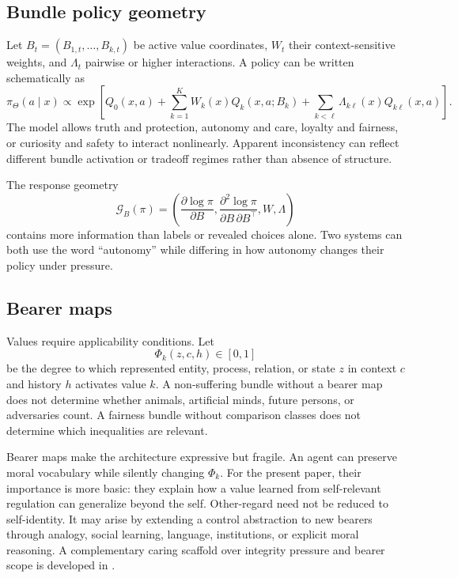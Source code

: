 \documentclass[11pt]{article}
\begin{document}
\subsection{Bundle policy geometry}

Let $B_t=(B_{1,t},\ldots,B_{k,t})$ be active value coordinates, $W_t$ their context-sensitive weights, and $\Lambda_t$ pairwise or higher interactions. A policy can be written schematically as
\begin{equation}
\pi_{\Theta}(a\mid x)
\propto
\exp\!\left[
Q_0(x,a)
+
\sum_{k=1}^K W_k(x)Q_k(x,a;B_k)
+
\sum_{k<\ell}\Lambda_{k\ell}(x)Q_{k\ell}(x,a)
\right].
\label{eq:bundle-policy}
\end{equation}
The model allows truth and protection, autonomy and care, loyalty and fairness, or curiosity and safety to interact nonlinearly. Apparent inconsistency can reflect different bundle activation or tradeoff regimes rather than absence of structure.

The response geometry
\begin{equation}
\mathcal G_B(\pi)
=
\left(
\frac{\partial\log\pi}{\partial B},
\frac{\partial^2\log\pi}{\partial B\,\partial B^\top},
W,\Lambda
\right)
\label{eq:response-geometry}
\end{equation}
contains more information than labels or revealed choices alone. Two systems can both use the word ``autonomy'' while differing in how autonomy changes their policy under pressure.

\subsection{Bearer maps}

Values require applicability conditions. Let
\begin{equation}
\Phi_k(z,c,h)\in[0,1]
\label{eq:bearer-map}
\end{equation}
be the degree to which represented entity, process, relation, or state $z$ in context $c$ and history $h$ activates value $k$. A non-suffering bundle without a bearer map does not determine whether animals, artificial minds, future persons, or adversaries count. A fairness bundle without comparison classes does not determine which inequalities are relevant.

Bearer maps make the architecture expressive but fragile. An agent can preserve moral vocabulary while silently changing $\Phi_k$. For the present paper, their importance is more basic: they explain how a value learned from self-relevant regulation can generalize beyond the self. Other-regard need not be reduced to self-identity. It may arise by extending a control abstraction to new bearers through analogy, social learning, language, institutions, or explicit moral reasoning. A complementary caring scaffold over integrity pressure and bearer scope is developed in \citet{zarncke2026uoc}.
\end{document}
